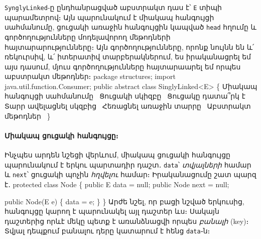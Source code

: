 \texttt{SynglyLinked}-ը ընդհանրացված աբստրակտ դաս է՝ \texttt{E} 
տիպի պարամետրով։ Այն պարունակում է միակապ հանգույցի սահմանումը, 
ցուցակի առաջին հանգույցին կապված \texttt{head} հղումը և 
գործողությունները մոդելավորող մեթոդների հայտարարությունները։ 
Այն գործողությունները, որոնք նույնն են և՛ ռեկուրսիվ, և՛ իտերատիվ 
տարբերակներում, ես իրականացրել եմ այս դասում, մյուս 
գործողությունները հայտարաարել եմ որպես աբստրակտ մեթոդներ։
\endmoddef{}
package structures;
import java.util.function.Consumer;
public abstract class SinglyLinked<E> \{
    \LA{}Միակապ հանգույցի սահմանումը~{\nwtagstyle{}}\RA{}
    \LA{}Ցուցակի սկիզբը~{\nwtagstyle{}}\RA{}
    \LA{}Ցուցակը դատա՞րկ է~{\nwtagstyle{}}\RA{}
    \LA{}Տարր ավելացնել սկզբից~{\nwtagstyle{}}\RA{}
    \LA{}Հեռացնել առաջին տարրը~{\nwtagstyle{}}\RA{}
    \LA{}Աբստրակտ մեթոդներ~{\nwtagstyle{}}\RA{}
\}
\nwendcode{}\nwdocspar

%
%
\paragraph{Միակապ ցուցակի հանգույցը։}
Ինչպես արդեն նշեցի վերևում, միակապ ցուցակի հանգույցը պարունակում 
է երկու պարտադիր դաշտ․ \texttt{data}՝ \emph{տվյալների} համար և 
\texttt{next}՝ ցուցակի պոչին \emph{հղվելու} համար։ Իրականացումը 
շատ պարզ է․
\nwenddocs{}\endmoddef{}
protected class Node \{
    public E data = null;
    public Node next = null;

    public Node(E e)
    \{
        data = e;
    \}
\}
\nwendcode{}\nwdocspar
Արժե նշել, որ բացի նշված երկուսից, հանգույցը կարող է պարունակել 
այլ դաշտեր ևս։ Սակայն դաշտերից որևէ մեկը պետք է առանձնացվի որպես 
\emph{բանալի} (key)։ Տվյալ դեպքում բանալու դերը կատարում է հենց 
\texttt{data}֊ն։

%
%

